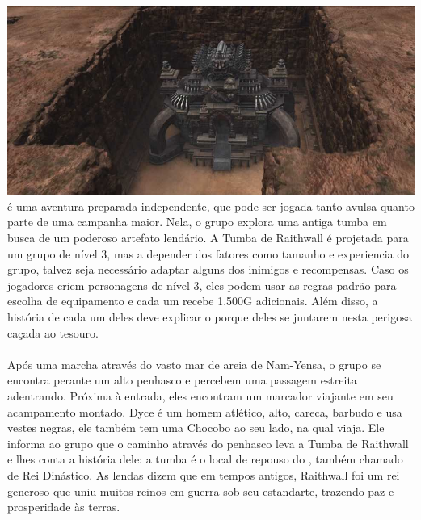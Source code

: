 %
\\\\
%
\includegraphics[width=\columnwidth]{./art/tombofraithwall/tomb1.jpg}
%
\ofpar
%
 é uma aventura preparada independente, que pode ser jogada tanto avulsa quanto parte de uma campanha maior. 
Nela, o grupo explora uma antiga tumba em busca de um poderoso artefato lendário.
A Tumba de Raithwall é projetada para um grupo de nível 3, mas a depender dos fatores como tamanho e experiencia do grupo, talvez seja necessário adaptar alguns dos inimigos e recompensas.
Caso os jogadores criem personagens de nível 3, eles podem usar as regras padrão para escolha de equipamento e cada um recebe 1.500G adicionais.
Além disso, a história de cada um deles deve explicar o porque deles se juntarem nesta perigosa caçada ao tesouro.
%
\ofpar
%
\\\\
%
Após uma marcha através do vasto mar de areia de Nam-Yensa, o grupo se encontra perante um alto penhasco e percebem uma passagem estreita adentrando.
Próxima à entrada, eles encontram um marcador viajante  em seu acampamento montado.
Dyce é um homem atlético, alto, careca, barbudo e usa vestes negras, ele também tem uma Chocobo ao seu lado, na qual viaja.
Ele informa ao grupo que o caminho através do penhasco leva a Tumba de Raithwall e lhes conta a história dele: a tumba é o local de repouso do , também chamado de Rei Dinástico.
As lendas dizem que em tempos antigos, Raithwall foi um rei generoso que uniu muitos reinos em guerra sob seu estandarte, trazendo paz e prosperidade às terras.
